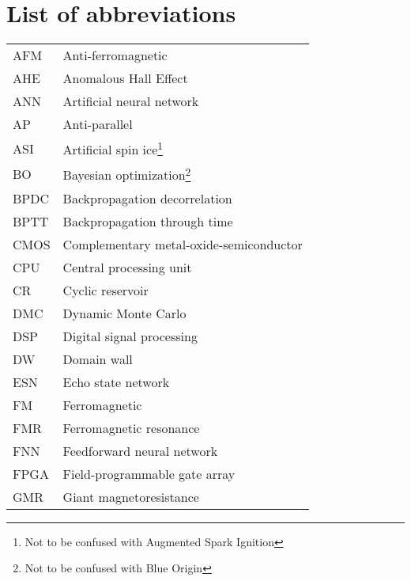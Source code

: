 \chapter{List of abbreviations}
{
    \addtolength{\skip\footins}{1pc}
    \begin{longtable}[l]{ll}
        AFM   & Anti-ferromagnetic                          \\
        AHE   & Anomalous Hall Effect                       \\
        ANN   & Artificial neural network                   \\
        AP    & Anti-parallel                               \\
        ASI   & Artificial spin ice\footnote{Not to be confused with Augmented Spark Ignition} \\
        BO    & Bayesian optimization\footnote{Not to be confused with Blue Origin} \\
        BPDC  & Backpropagation decorrelation               \\
        BPTT  & Backpropagation through time                \\
        CMOS  & Complementary metal-oxide-semiconductor     \\
        CPU   & Central processing unit                     \\
        CR    & Cyclic reservoir                            \\
        DMC   & Dynamic Monte Carlo                         \\
        DSP   & Digital signal processing                   \\
        DW    & Domain wall                                 \\
        ESN   & Echo state network                          \\
        FM    & Ferromagnetic                               \\
        FMR   & Ferromagnetic resonance                     \\ %
        FNN   & Feedforward neural network                  \\
        FPGA  & Field-programmable gate array               \\
        GMR   & Giant magnetoresistance                     \\

\end{longtable}}
